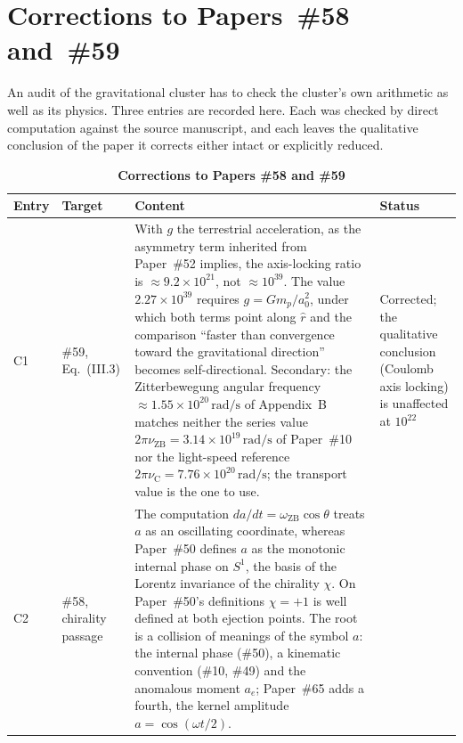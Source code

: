 \documentclass[%
 reprint, amsmath,amssymb, aps, prb, ]{revtex4-2}
\numberwithin{equation}{section}
\newcommand{\iphase}{\theta}
\newcommand{\omZB}{\omega_{\text{ZB}}}
\newcommand{\nuZB}{\nu_{\text{ZB}}}
\newcommand{\nuC}{\nu_{\text{C}}}
\begin{document}
\section{Corrections to Papers~\#58 and~\#59}
\label{sec:corrections}

An audit of the gravitational cluster has to check the cluster's own arithmetic as well as its physics. Three entries are recorded here. Each was checked by direct computation against the source manuscript, and each leaves the qualitative conclusion of the paper it corrects either intact or explicitly reduced.

\begin{table}[t!]
\centering
\caption{\textbf{Corrections to Papers \#58 and \#59}}
\label{tab:corrections}
\renewcommand{\arraystretch}{1.4}
\setlength{\tabcolsep}{8pt}
\begin{tabular}{p{1.0cm}>{\raggedright\arraybackslash}p{2.3cm}p{8.6cm}>{\raggedright\arraybackslash}p{3.6cm}}
\toprule
\textbf{Entry} & \textbf{Target} & \textbf{Content} & \textbf{Status} \\
\midrule
C1
& \#59, Eq.~(III.3)
& With $g$ the terrestrial acceleration, as the asymmetry term inherited from Paper~\#52 implies, the axis-locking ratio is $\approx 9.2\times10^{21}$, not $\approx10^{39}$. The value $2.27\times10^{39}$ requires $g=Gm_p/a_0^2$, under which both terms point along $\hat r$ and the comparison ``faster than convergence toward the gravitational direction'' becomes self-directional. Secondary: the Zitterbewegung angular frequency $\approx1.55\times10^{20}\,\mathrm{rad/s}$ of Appendix~B matches neither the series value $2\pi\nuZB = 3.14\times10^{19}\,\mathrm{rad/s}$ of Paper~\#10 nor the light-speed reference $2\pi\nuC = 7.76\times10^{20}\,\mathrm{rad/s}$; the transport value is the one to use.
& Corrected; the qualitative conclusion (Coulomb axis locking) is unaffected at $10^{22}$ \\
\addlinespace[0.3cm]
C2
& \#58, chirality passage
& The computation $da/dt=\omZB\cos\iphase$ treats $a$ as an oscillating coordinate, whereas Paper~\#50 defines $a$ as the monotonic internal phase on $S^1$, the basis of the Lorentz invariance of the chirality $\chi$. On Paper~\#50's definitions $\chi=+1$ is well defined at both ejection points. The root is a collision of meanings of the symbol $a$: the internal phase (\#50), a kinematic convention (\#10, \#49) and the anomalous moment $a_e$; Paper~\#65 adds a fourth, the kernel amplitude $a=\cos(\omega t/2)$.

\end{tabular}
\end{table}
\end{document}
